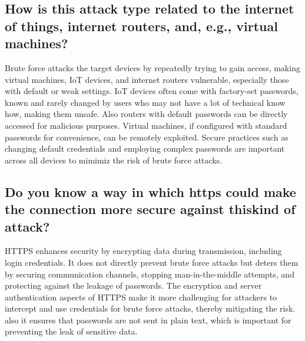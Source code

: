 \subsection{How is this attack type related to the internet of things, internet routers, and, e.g., virtual machines?}
Brute force attacks the target devices by repeatedly trying to gain access, making virtual machines, IoT devices, and internet routers vulnerable,
especially those with default or weak settings. IoT devices often come with factory-set passwords, known and rarely changed by users who may not have a lot of technical know how,
making them unsafe. Also routers with default passwords can be directly accessed for malicious purposes.
Virtual machines, if configured with standard passwords for convenience,
can be remotely exploited. Secure practices such as changing default credentials and employing complex passwords are important across all devices to
mimimiz the risk of brute force attacks.

\subsection{Do you know a way in which https could make the connection more secure against thiskind of attack?}
HTTPS enhances security by encrypting data during transmission, including login credentials.
It does not directly prevent brute force attacks but deters them by securing communication channels, stopping man-in-the-middle attempts,
and protecting against the leakage of passwords.
The encryption and server authentication aspects of HTTPS make it more challenging for attackers to intercept and use credentials for brute force attacks,
thereby mitigating the risk. also it ensures that passwords are not sent in plain text, which is important for preventing the leak of sensitive data.
